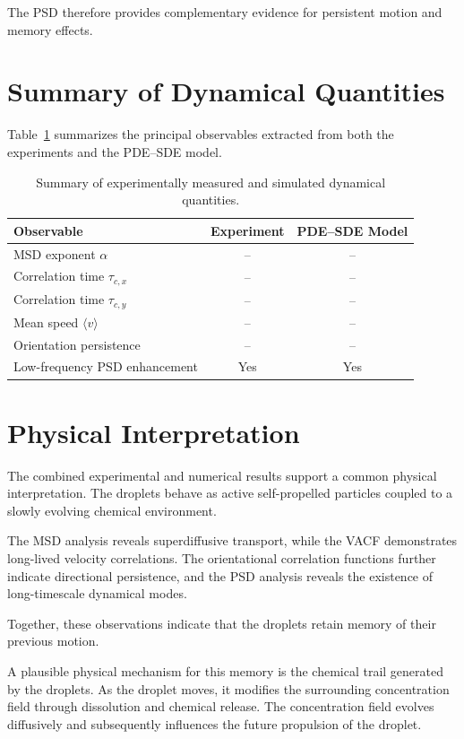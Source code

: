 The PSD therefore provides complementary evidence for persistent motion and memory effects.

\section{Summary of Dynamical Quantities}

Table~\ref{tab:summary} summarizes the principal observables extracted from both the experiments and the PDE--SDE model.

\begin{table}[h]
\centering
\caption{Summary of experimentally measured and simulated dynamical quantities.}
\label{tab:summary}
\begin{tabular}{lcc}
\hline
Observable & Experiment & PDE--SDE Model \\
\hline
MSD exponent $\alpha$ & -- & -- \\
Correlation time $\tau_{c,x}$ & -- & -- \\
Correlation time $\tau_{c,y}$ & -- & -- \\
Mean speed $\langle v\rangle$ & -- & -- \\
Orientation persistence & -- & -- \\
Low-frequency PSD enhancement & Yes & Yes \\
\hline
\end{tabular}
\end{table}

\section{Physical Interpretation}

The combined experimental and numerical results support a common physical interpretation. The droplets behave as active self-propelled particles coupled to a slowly evolving chemical environment.

The MSD analysis reveals superdiffusive transport, while the VACF demonstrates long-lived velocity correlations. The orientational correlation functions further indicate directional persistence, and the PSD analysis reveals the existence of long-timescale dynamical modes.

Together, these observations indicate that the droplets retain memory of their previous motion.

A plausible physical mechanism for this memory is the chemical trail generated by the droplets. As the droplet moves, it modifies the surrounding concentration field through dissolution and chemical release. The concentration field evolves diffusively and subsequently influences the future propulsion of the droplet.

